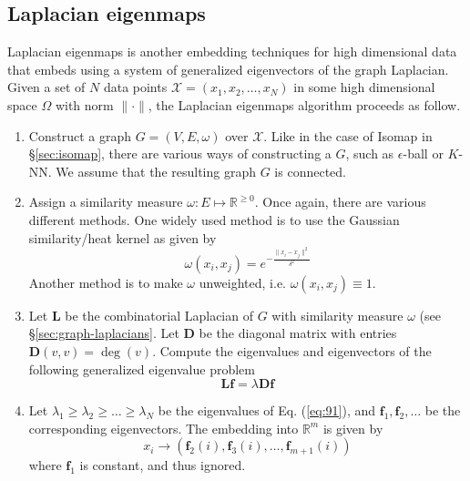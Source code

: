 \subsection{Laplacian eigenmaps}
\label{sec:laplacian-eigenmaps}
Laplacian eigenmaps \citet{belkin03:_laplac} is another embedding
techniques for high dimensional data that embeds using a system of
generalized eigenvectors of the graph Laplacian. Given a set of $N$
data points $\mathcal{X} = (x_1, x_2, \dots, x_N)$ in some high
dimensional space $\Omega$ with norm $\| \cdot \|$, the Laplacian
eigenmaps algorithm proceeds as follow.
\begin{enumerate}
\item Construct a graph $G = (V,E,\omega)$ over $\mathcal{X}$. Like in
  the case of Isomap in \S \ref{sec:isomap}, there are various ways of
  constructing a $G$, such as $\epsilon$-ball or $K$-NN. We assume
  that the resulting graph $G$ is connected. 
\item Assign a similarity measure $\omega \colon E \mapsto
  \mathbb{R}^{\geq 0}$. Once again, there are various different
  methods. One widely used method is to use the Gaussian
  similarity/heat kernel as given by
  \begin{equation}
    \label{eq:88}
    \omega(x_i,x_j) = e^{-\frac{\|x_i - x_j\|^2}{\delta^2}}
  \end{equation}
  Another method is to make $\omega$ unweighted, i.e. $\omega(x_i,x_j)
  \equiv 1$.
\item Let $\mathbf{L}$ be the combinatorial Laplacian of $G$ with
  similarity measure $\omega$ (see \S \ref{sec:graph-laplacians}. Let
  $\mathbf{D}$ be the diagonal matrix with entries $\mathbf{D}(v,v) =
  \deg(v)$. Compute the eigenvalues and eigenvectors of the following
  generalized eigenvalue problem
  \begin{equation}
    \label{eq:91}
    \mathbf{Lf} = \lambda \mathbf{Df}
  \end{equation}
\item Let $\lambda_1 \geq \lambda_2 \geq \dots \geq \lambda_N$ be the
  eigenvalues of Eq. (\ref{eq:91}), and $\mathbf{f}_1, \mathbf{f}_2,
  \dots$ be the corresponding eigenvectors. The embedding into
  $\mathbb{R}^{m}$ is given by
  \begin{equation}
    \label{eq:92}
    x_i \rightarrow (\mathbf{f}_2(i), \mathbf{f}_3(i), \dots,
    \mathbf{f}_{m+1}(i))
  \end{equation}
  where $\mathbf{f}_1$ is constant, and thus ignored.  
\end{enumerate}
